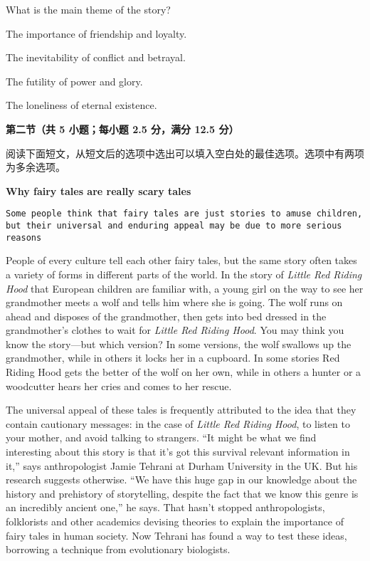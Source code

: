 \documentclass{exam-zh}
\begin{document}
\begin{question}
  What is the main theme of the story?
  \begin{choices}
  \item The importance of friendship and loyalty.
  \item The inevitability of conflict and betrayal.
  \item The futility of power and glory.
  \item The loneliness of eternal existence.
  \end{choices}
\end{question}

\begin{flushleft}
  {\bfseries 第二节（共 5 小题；每小题 2.5 分，满分 12.5 分）}
\end{flushleft}

阅读下面短文，从短文后的选项中选出可以填入空白处的最佳选项。选项中有两项为多余选项。

{\centering \bfseries Why fairy tales are really scary tales \par}

\begin{center}
  \texttt{Some people think that fairy tales are just stories to amuse children, but their universal and enduring appeal may be due to more serious reasons}
\end{center}

People of every culture tell each other fairy tales, but the same story often takes a variety of forms in different parts of the world. In the story of \textit{Little Red Riding Hood} that European children are familiar with, a young girl on the way to see her grandmother meets a wolf and tells him where she is going. The wolf runs on ahead and disposes of the grandmother, then gets into bed dressed in the grandmother's clothes to wait for \textit{Little Red Riding Hood}. You may think you know the story—but which version? In some versions, the wolf swallows up the grandmother, while in others it locks her in a cupboard. In some stories Red Riding Hood gets the better of the wolf on her own, while in others a hunter or a woodcutter hears her cries and comes to her rescue.

The universal appeal of these tales is frequently attributed to the idea that they contain cautionary messages: in the case of \textit{Little Red Riding Hood}, to listen to your mother, and avoid talking to strangers. ``It might be what we find interesting about this story is that it's got this survival relevant information in it,'' says anthropologist Jamie Tehrani at Durham University in the UK. But his research suggests otherwise. ``We have this huge gap in our knowledge about the history and prehistory of storytelling, despite the fact that we know this genre is an incredibly ancient one,'' he says. That hasn't stopped anthropologists, folklorists and other academics devising theories to explain the importance of fairy tales in human society. Now Tehrani has found a way to test these ideas, borrowing a technique from evolutionary biologists.
\end{document}
